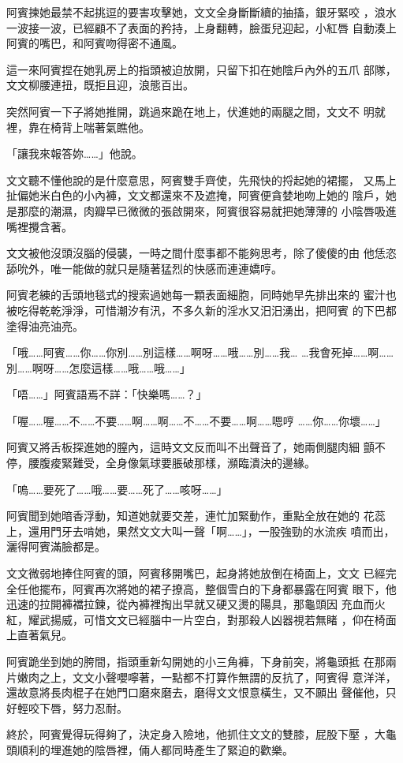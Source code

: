 阿賓揀她最禁不起挑逗的要害攻擊她，文文全身斷斷續的抽搐，銀牙緊咬
，浪水一波接一波，已經顧不了表面的矜持，上身翻轉，臉蛋兒迎起，小紅唇
自動湊上阿賓的嘴巴，和阿賓吻得密不通風。

這一來阿賓捏在她乳房上的指頭被迫放開，只留下扣在她陰戶內外的五爪
部隊，文文柳腰連扭，既拒且迎，浪態百出。

突然阿賓一下子將她推開，跳過來跪在地上，伏進她的兩腿之間，文文不
明就裡，靠在椅背上喘著氣瞧他。

「讓我來報答妳……」他說。

文文聽不懂他說的是什麼意思，阿賓雙手齊使，先飛快的捋起她的裙擺，
又馬上扯偏她米白色的小內褲，文文都還來不及遮掩，阿賓便貪婪地吻上她的
陰戶，她是那麼的潮濕，肉瓣早已微微的張啟開來，阿賓很容易就把她薄薄的
小陰唇吸進嘴裡攪含著。

文文被他沒頭沒腦的侵襲，一時之間什麼事都不能夠思考，除了傻傻的由
他恁恣舔吮外，唯一能做的就只是隨著猛烈的快感而連連嬌哼。

阿賓老練的舌頭地毯式的搜索過她每一顆表面細胞，同時她早先排出來的
蜜汁也被吃得乾乾淨淨，可惜潮汐有汛，不多久新的淫水又汨汨湧出，把阿賓
的下巴都塗得油亮油亮。

「哦……阿賓……你……你別……別這樣……啊呀……哦……別……我…
…我會死掉……啊……別……啊呀……怎麼這樣……哦……哦……」

「唔……」阿賓語焉不詳：「快樂嗎……？」

「喔……喔……不……不要……啊……啊……不……不要……啊……嗯哼
……你……你壞……」

阿賓又將舌板探進她的膣內，這時文文反而叫不出聲音了，她兩側腿肉細
顫不停，腰腹痠緊難受，全身像氣球要脹破那樣，瀕臨潰決的邊緣。

「嗚……要死了……哦……要……死了……咳呀……」

阿賓聞到她暗香浮動，知道她就要交差，連忙加緊動作，重點全放在她的
花蕊上，還用門牙去啃她，果然文文大叫一聲「啊……」，一股強勁的水流疾
噴而出，灑得阿賓滿臉都是。

文文微弱地捧住阿賓的頭，阿賓移開嘴巴，起身將她放倒在椅面上，文文
已經完全任他擺布，阿賓再次將她的裙子撩高，整個雪白的下身都暴露在阿賓
眼下，他迅速的拉開褲襠拉鍊，從內褲裡掏出早就又硬又燙的陽具，那龜頭因
充血而火紅，耀武揚威，可惜文文已經腦中一片空白，對那殺人凶器視若無睹
，仰在椅面上直著氣兒。

阿賓跪坐到她的胯間，指頭重新勾開她的小三角褲，下身前突，將龜頭抵
在那兩片嫩肉之上，文文小聲嚶嚀著，一點都不打算作無謂的反抗了，阿賓得
意洋洋，還故意將長肉棍子在她門口磨來磨去，磨得文文恨意橫生，又不願出
聲催他，只好輕咬下唇，努力忍耐。

終於，阿賓覺得玩得夠了，決定身入險地，他抓住文文的雙膝，屁股下壓
，大龜頭順利的埋進她的陰唇裡，倆人都同時產生了緊迫的歡樂。

